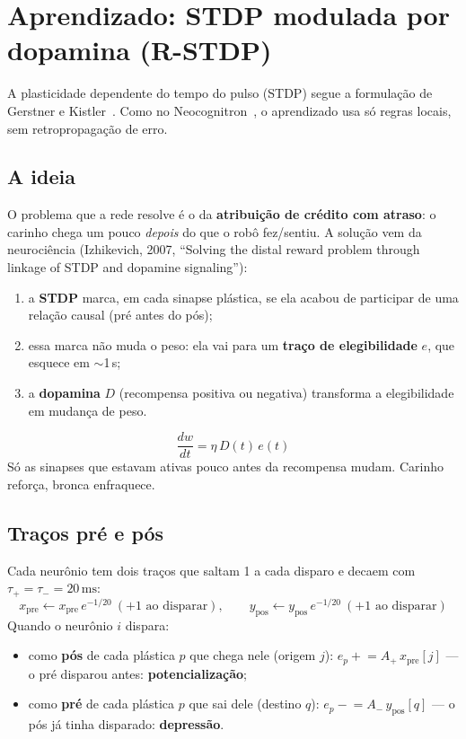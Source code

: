 \documentclass[11pt,a4paper]{article}
\newcommand{\ms}{\,\mathrm{ms}}
\begin{document}
\section{Aprendizado: STDP modulada por dopamina (R-STDP)}\label{sec:stdp}

A plasticidade dependente do tempo do pulso (STDP) segue a formulação de Gerstner e Kistler~\cite{gerstner2002}. Como no
Neocognitron~\cite{fukushima1980}, o aprendizado usa só regras locais, sem retropropagação de erro.

\subsection{A ideia}

O problema que a rede resolve é o da \textbf{atribuição de crédito com atraso}: o carinho chega um pouco \emph{depois} do que o robô
fez/sentiu. A solução vem da neurociência (Izhikevich, 2007, “Solving the distal reward problem through linkage of STDP and dopamine
signaling”):
\begin{enumerate}
  \item a \textbf{STDP} marca, em cada sinapse plástica, se ela acabou de participar de uma relação causal (pré antes do pós);
  \item essa marca não muda o peso: ela vai para um \textbf{traço de elegibilidade} $e$, que esquece em $\sim$1\,s;
  \item a \textbf{dopamina} $D$ (recompensa positiva ou negativa) transforma a elegibilidade em mudança de peso.
\end{enumerate}
\begin{equation}
\boxed{\ \frac{dw}{dt} = \eta\, D(t)\, e(t)\ }
\end{equation}
Só as sinapses que estavam ativas pouco antes da recompensa mudam. Carinho reforça, bronca enfraquece.

\subsection{Traços pré e pós}

Cada neurônio tem dois traços que saltam 1 a cada disparo e decaem com $\tau_+ = \tau_- = 20\ms$:
\begin{equation}
x_\text{pre} \leftarrow x_\text{pre}\,e^{-1/20} \ (+1 \text{ ao disparar}), \qquad y_\text{pos} \leftarrow y_\text{pos}\,e^{-1/20} \ (+1 \text{ ao disparar})
\end{equation}
Quando o neurônio $i$ dispara:
\begin{itemize}
  \item como \textbf{pós} de cada plástica $p$ que chega nele (origem $j$): $e_p \mathrel{+}= A_+\,x_\text{pre}[j]$ — o pré disparou antes: \textbf{potencialização};
  \item como \textbf{pré} de cada plástica $p$ que sai dele (destino $q$): $e_p \mathrel{-}= A_-\,y_\text{pos}[q]$ — o pós já tinha disparado: \textbf{depressão}.
\end{itemize}
\end{document}
